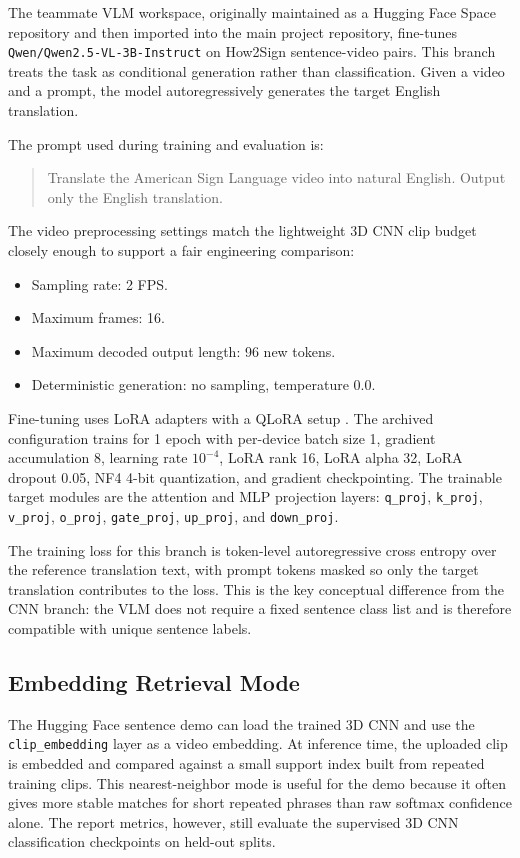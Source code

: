 \documentclass[10pt,twocolumn,letterpaper]{article}
\begin{document}
The teammate VLM workspace, originally maintained as a Hugging Face Space repository and then imported into the main project repository, fine-tunes \texttt{Qwen/Qwen2.5-VL-3B-Instruct} on How2Sign sentence-video pairs. This branch treats the task as conditional generation rather than classification. Given a video and a prompt, the model autoregressively generates the target English translation.

The prompt used during training and evaluation is:
\begin{quote}
\small
Translate the American Sign Language video into natural English. Output only the English translation.
\end{quote}

The video preprocessing settings match the lightweight 3D CNN clip budget closely enough to support a fair engineering comparison:
\begin{itemize}
    \item Sampling rate: 2 FPS.
    \item Maximum frames: 16.
    \item Maximum decoded output length: 96 new tokens.
    \item Deterministic generation: no sampling, temperature 0.0.
\end{itemize}

Fine-tuning uses LoRA adapters with a QLoRA setup \cite{hu2022lora,dettmers2023qlora}. The archived configuration trains for 1 epoch with per-device batch size 1, gradient accumulation 8, learning rate $10^{-4}$, LoRA rank 16, LoRA alpha 32, LoRA dropout 0.05, NF4 4-bit quantization, and gradient checkpointing. The trainable target modules are the attention and MLP projection layers:
\texttt{q\_proj}, \texttt{k\_proj}, \texttt{v\_proj}, \texttt{o\_proj}, \texttt{gate\_proj}, \texttt{up\_proj}, and \texttt{down\_proj}.

The training loss for this branch is token-level autoregressive cross entropy over the reference translation text, with prompt tokens masked so only the target translation contributes to the loss. This is the key conceptual difference from the CNN branch: the VLM does not require a fixed sentence class list and is therefore compatible with unique sentence labels.

\subsection{Embedding Retrieval Mode}

The Hugging Face sentence demo can load the trained 3D CNN and use the \texttt{clip\_embedding} layer as a video embedding. At inference time, the uploaded clip is embedded and compared against a small support index built from repeated training clips. This nearest-neighbor mode is useful for the demo because it often gives more stable matches for short repeated phrases than raw softmax confidence alone. The report metrics, however, still evaluate the supervised 3D CNN classification checkpoints on held-out splits.
\end{document}
